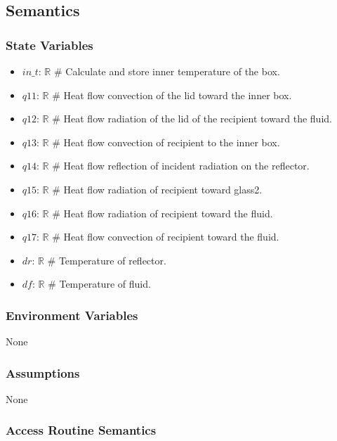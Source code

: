 \documentclass[12pt, titlepage]{article}
\begin{document}
\subsection{Semantics}

\subsubsection{State Variables}
\begin{itemize}
    \item $in\_t$: $\mathbb{R}$   \# Calculate and store inner temperature of the box. 
    \item $q11$: $\mathbb{R}$ \# Heat flow convection of the lid toward the inner box. 
    \item $q12$: $ \mathbb{R}$ \# Heat flow radiation of the lid of the recipient toward the fluid.
    \item $q13$: $ \mathbb{R}$ \# Heat flow convection of recipient to the inner box.
    \item $q14$: $ \mathbb{R}$ \# Heat flow reflection of incident radiation on the reflector. 
    \item $q15$: $ \mathbb{R}$ \# Heat flow radiation of recipient toward glass2. 
    \item $q16$: $ \mathbb{R}$ \# Heat flow radiation of recipient toward the fluid. 
    \item $q17$: $ \mathbb{R}$ \# Heat flow convection of recipient toward the fluid. 
    \item $dr$: $ \mathbb{R}$ \# Temperature of reflector. 
    \item $df$: $ \mathbb{R}$ \# Temperature of fluid. 
\end{itemize}


 

\subsubsection{Environment Variables}

None

\subsubsection{Assumptions}

None

\subsubsection{Access Routine Semantics}
\end{document}
